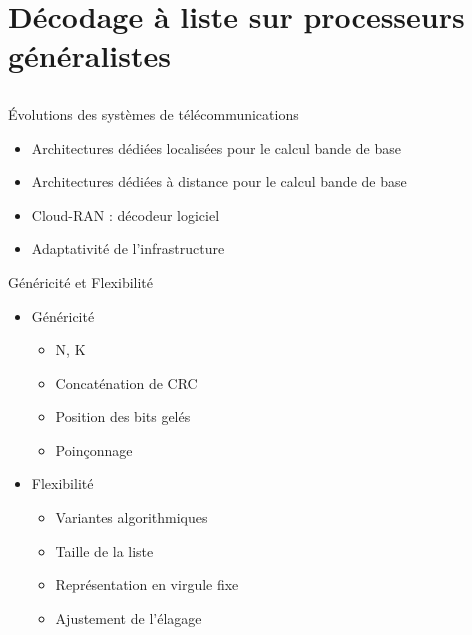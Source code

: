 \section[Décodeur logiciel à liste]{Décodage à liste sur processeurs généralistes}
\subsection*{}

\begin{frame}[c]{\'Evolutions des systèmes de télécommunications}
	\begin{itemize}
		\item Architectures dédiées localisées pour le calcul bande de base
		\item Architectures dédiées à distance pour le calcul bande de base
		\item Cloud-RAN : décodeur logiciel
		\item Adaptativité de l'infrastructure
	\end{itemize}
\end{frame}


\begin{frame}[c]{Généricité et Flexibilité}
  \vfill
	\begin{itemize}
		\item Généricité
		\begin{itemize}
			\item N, K
			\item Concaténation de CRC
			\item Position des bits gelés
			\item Poinçonnage
		\end{itemize}
    \vfill
		\item Flexibilité
		\begin{itemize}
			\item Variantes algorithmiques
			\item Taille de la liste
			\item Représentation en virgule fixe
			\item Ajustement de l'élagage
		\end{itemize}
	\end{itemize}
  \vfill
\end{frame}


